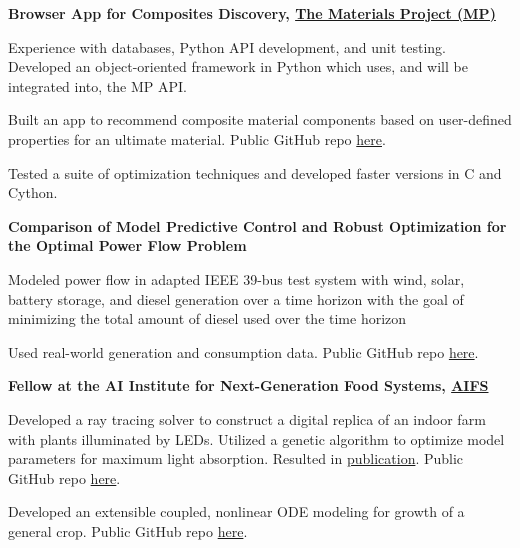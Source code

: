 \documentclass[letterpaper,10.8pt]{article}
\newcommand{\resumeItemNoTitle}[2]{\item\small{\textbf{#1}{ #2 \vspace{-2pt}}}}
\begin{document}
\resumeItemNoTitle{Browser App for Composites Discovery, \href{https://next-gen.materialsproject.org/}{The Materials Project (MP)}}{}
\begin{description}[font=$\bullet$]
\item{Experience with databases, Python API development, and unit testing. Developed an object-oriented framework in Python which uses, and will be integrated into, the MP API.}
\item{Built an app to recommend composite material components based on user-defined properties for an ultimate material. Public GitHub repo \href{https://github.com/carlacupcake/hashin_shtrikman_mp}{here}.}
\item{Tested a suite of optimization techniques and developed faster versions in C and Cython.}
\end{description}  

\resumeItemNoTitle{Comparison of Model Predictive Control and Robust Optimization for the Optimal Power Flow Problem}{}
\begin{description}[font=$\bullet$]
\item{Modeled power flow in adapted IEEE 39-bus test system with wind, solar, battery storage, and diesel generation over a time horizon with the goal of minimizing the total amount of diesel used over the time horizon}
\item{Used real-world generation and consumption data. Public GitHub repo \href{https://github.com/carlacupcake/CE295-OPF}{here}.} 
\end{description}  

\resumeItemNoTitle{Fellow at the AI Institute for Next-Generation Food Systems, \href{https://aifs.ucdavis.edu/}{AIFS}}{}
\begin{description}[font=$\bullet$]
\item{Developed a ray tracing solver to construct a digital replica of an indoor farm with plants illuminated by LEDs. Utilized a genetic algorithm to optimize model parameters for maximum light absorption. Resulted in \href{https://doi.org/10.1007/s00466-023-02421-9}{publication}. Public GitHub repo \href{https://github.com/emremengi/INDOOR_FARMING_PAPER}{here}.}
\item{Developed an extensible coupled, nonlinear ODE modeling for growth of a general crop. Public GitHub repo \href{https://github.com/carlacupcake/smartfarm}{here}.}
\end{description} 
\end{document}
